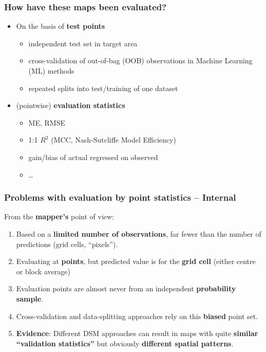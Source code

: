 \documentclass[aspectratio=169, 10pt]{beamer}
\begin{document}
\begin{frame}
  \frametitle{How have these maps been evaluated?}
    \begin{itemize}
        \item On the basis of \textbf{test points}
        \begin{itemize}
            \item independent test set in target area
            \item cross-validation of out-of-bag (OOB) observations in Machine Learning (ML) methods
            \item repeated splits into test/training of one dataset
        \end{itemize}
      \item (pointwise) \textbf{evaluation statistics}
        \begin{itemize}
        \item ME, RMSE
        \item 1:1 $R^2$ (MCC, Nash-Sutcliffe Model
          Efficiency)
        \item gain/bias of actual regressed on observed
        \item \ldots
        \end{itemize}
    \end{itemize}
\end{frame}


\begin{frame}
  \frametitle{Problems with evaluation by point statistics -- Internal}
From the \textbf{mapper's} point of view:
\begin{enumerate}
    \item Based on a \textbf{limited number of observations}, far fewer than the number of predictions (grid cells, ``pixels'').
    \item Evaluating at \textbf{points}, but predicted value is for the \textbf{grid cell} (either centre or block average)
    \item Evaluation points are almost never from an independent  \textbf{probability sample}.
  \item Cross-validation and data-splitting approaches rely on this \textbf{biased} point set.
  \item \textbf{Evidence}: Different DSM approaches can result in maps    with quite \textbf{similar ``validation statistics''} but obviously \textbf{different spatial patterns}.
  \end{enumerate}
\end{frame}
\end{document}
